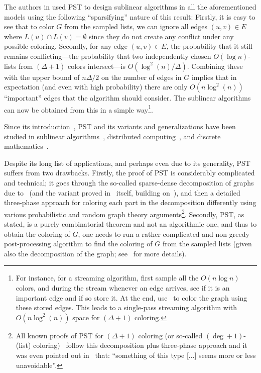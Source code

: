 The authors in \cite{AssadiCK19} used PST to design sublinear algorithms in all the aforementioned models using the following ``sparsifying'' nature of this result: Firstly, it is easy to see that to color $G$ from the sampled 
lists, we can ignore all edges $(u,v) \in E$ where $L(u) \cap L(v) = \emptyset$ since they do not create any conflict under any possible coloring. Secondly, for any edge $(u,v) \in E$, the probability that it still remains conflicting---the probability that two independently chosen $O(\log{n})$-lists from $(\Delta+1)$ colors intersect---is $O(\log^2\!{(n)}/\Delta)$. Combining these with the upper bound of $n\Delta/2$ 
on the number of edges in $G$ implies that in expectation (and even with high probability) there are only $O(n\log^2\!{(n)})$  ``important'' edges that the algorithm should consider. 
The sublinear algorithms can now 
be obtained from this in a simple way\footnote{For instance, for a streaming algorithm, first sample all the $O(n\log{n})$ colors, and during the stream whenever an edge arrives, see if it is an important edge and if so store it. 
At the end, use~ to color the graph using these stored edges. This leads to a single-pass streaming algorithm with $O(n\log^2\!{(n)})$ space for $(\Delta+1)$ coloring.}.

Since its introduction~\cite{AssadiCK19}, PST and its variants and generalizations have been studied in sublinear algorithms~\cite{ChangFGUZ19,BeraCG20,AssadiKM22,ChakrabartiGS22,AssadiCGS23}, distributed computing~\cite{FischerHM23,FlinGHKN23,HalldorssonKNT22}, and discrete mathematics~\cite{AlonA20,AndersonBD22,KahnK23,KahnK24,HefetzK24}. 

Despite its long list of applications, and perhaps even due to its generality, PST suffers from two drawbacks. Firstly, the proof of PST is considerably complicated and technical; it goes through 
the so-called sparse-dense decomposition of graphs due to~\cite{Reed98} (and the variant proved in~\cite{AssadiCK19} itself, building on~\cite{HarrisSS16}), and then a detailed three-phase approach
for coloring each part in the decomposition differently using various probabilistic and random graph theory arguments\footnote{All known proofs of PST for $(\Delta+1)$ coloring (or so-called $(\deg+1)$-(list) 
coloring)~\cite{AssadiCK19,AlonA20,HalldorssonKNT22,KahnK23,FlinGHKN24} follow this decomposition plus three-phase approach and it was even pointed out in~\cite{KahnK23} that: ``something of this type [...] seems more or less
unavoidable''.}. Secondly, PST, as stated, is a purely combinatorial theorem and not an algorithmic one, and thus
to obtain the coloring of $G$, one needs to run a rather complicated and non-greedy post-processing algorithm to find the coloring of $G$ from the sampled lists (given also the decomposition of the graph; see~\cite{AssadiCK19} for more details). 

